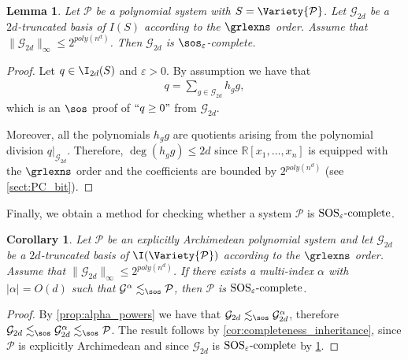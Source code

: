 \documentclass[11pt]{article}
\newtheorem{lemma}[theorem]{Lemma}
\newtheorem{corollary}[theorem]{Corollary}
\newcommand{\SOSe}{\rm{SOS}_\varepsilon\text{-complete}}
\begin{document}
\begin{lemma}\label{th:Grobner_basis_SOS_completeness}
    Let $\mathcal{P}$ be a polynomial system with $S = \Variety{\mathcal{P}}$. Let $\mathcal{G}_{2d}$ be a $2d$-truncated \GB basis of $I(S)$ according to the $\grlexns$ order. Assume that $\| \mathcal{G}_{2d} \|_{\infty} \leq 2^{poly(n^d)}$. Then $\mathcal{G}_{2d}$ is $\sos_{\varepsilon}$-complete.
\end{lemma}
\begin{proof}
    Let $q \in \I_{2d}(S)$ and $\varepsilon > 0$. By assumption we have that
    \begin{align*}
        q = \sum_{g \in \mathcal{G}_{2d}} h_g g,
    \end{align*}
    which is an $\sos$ proof of $``q \geq 0"$ from $\mathcal{G}_{2d}$.
    
    Moreover, all the polynomials $h_g g$ are quotients arising from the polynomial division $q|_{\mathcal{G}_{2d}}$. Therefore, $\deg(h_g g) \leq 2d$ since $\mathbb{R}[x_1, \dots, x_n]$ is equipped with the $\grlexns$ order and the coefficients are bounded by $2^{poly(n^d)}$ (see \cref{sect:PC_bit}).
\end{proof}

Finally, we obtain a method for checking whether a system $\mathcal{P}$ is $\SOSe$.


\begin{corollary}\label{cor:powers-complete}
    Let $\mathcal{P}$ be an explicitly Archimedean polynomial system and let $\mathcal{G}_{2d}$ be a $2d$-truncated \GB basis of $\I(\Variety{\mathcal{P}})$ according to the $\grlexns$ order. Assume that $\| \mathcal{G}_{2d} \|_{\infty} \leq 2^{poly(n^d)}$. If there exists a multi-index $\alpha$ with $|\alpha| = O(d)$ such that $\mathcal{G}^\alpha \lesssim_{\sos} \mathcal{P}$, then $\mathcal{P}$ is $\SOSe$.
\end{corollary}

\begin{proof}
    By \cref{prop:alpha_powers} we have that $\mathcal{G}_{2d} \lesssim_{\sos} \mathcal{G}_{2d}^{\alpha}$, therefore $\mathcal{G}_{2d} \lesssim_{\sos} \mathcal{G}_{2d}^{\alpha} \lesssim_{\sos} \mathcal{P}$. The result follows by \cref{cor:completeness_inheritance}, since $\mathcal{P}$ is explicitly Archimedean and since $\mathcal{G}_{2d}$ is $\SOSe$ by \cref{th:Grobner_basis_SOS_completeness}.
\end{proof}
\end{document}
